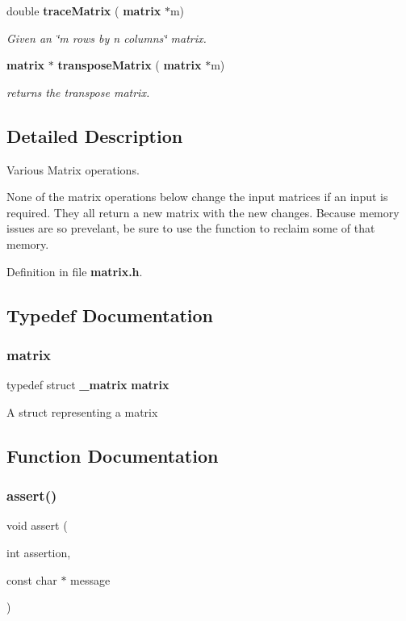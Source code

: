 \begin{DoxyCompactItemize}
double \textbf{ trace\+Matrix} (\textbf{ matrix} $\ast$m)
\begin{DoxyCompactList}\small\item\em Given an \char`\"{}m rows by n columns\char`\"{} matrix. \end{DoxyCompactList}\item 
\textbf{ matrix} $\ast$ \textbf{ transpose\+Matrix} (\textbf{ matrix} $\ast$m)
\begin{DoxyCompactList}\small\item\em returns the transpose matrix. \end{DoxyCompactList}\end{DoxyCompactItemize}


\subsection{Detailed Description}
Various Matrix operations.

None of the matrix operations below change the input matrices if an input is required. They all return a new matrix with the new changes. Because memory issues are so prevelant, be sure to use the  function to reclaim some of that memory. 



Definition in file \textbf{ matrix.\+h}.



\subsection{Typedef Documentation}
\mbox{\label{matrix_8h_abc75382643898dd572498a574bf891c7}} 
\subsubsection{matrix}
{\footnotesize\ttfamily typedef struct \textbf{ \+\_\+matrix}  \textbf{ matrix}}

A struct representing a matrix 

\subsection{Function Documentation}
\mbox{\label{matrix_8h_a8e41e30382335ea89f90b72db0b44d6f}} 
\subsubsection{assert()}
{\footnotesize\ttfamily void assert (\begin{DoxyParamCaption}\item[{int}]{assertion,  }\item[{const char $\ast$}]{message }\end{DoxyParamCaption})}



